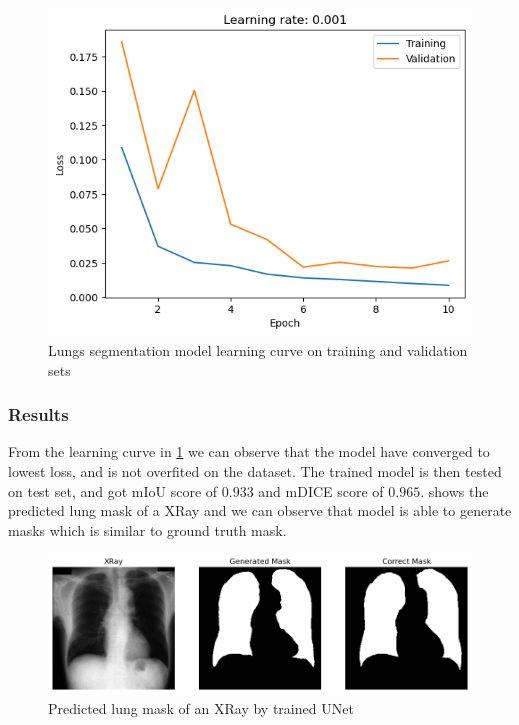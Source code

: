     \begin{figure}[htbp]
        \centering
        \includegraphics[width=\linewidth]{../plots/segmentation/learning.png}
        \caption{Lungs segmentation model learning curve on training and validation sets}
        \label{fig:lung-segmentation-learning-curve}
    \end{figure}

\subsubsection{Results}

    From the learning curve in \cref{fig:lung-segmentation-learning-curve} we can observe that the model have converged to lowest loss, and is not overfited on the dataset. The trained model is then tested on test set, and got mIoU score of $0.933$ and mDICE score of $0.965$.  shows the predicted lung mask of a XRay and we can observe that model is able to generate masks which is similar to ground truth mask.

    \begin{figure}[htbp]
        \centering
        \includegraphics[width=\linewidth]{../plots/segmentation/result.png}
        \caption{Predicted lung mask of an XRay by trained UNet}
        \label{fig:lung-segmentation-result}
    \end{figure}